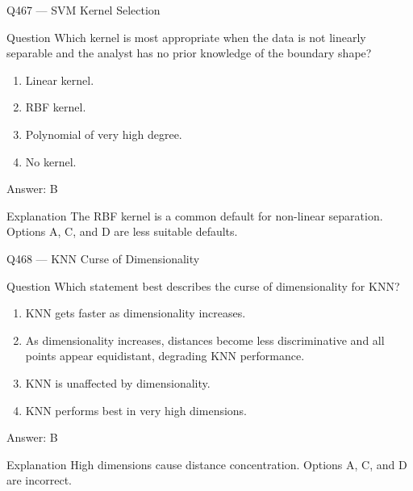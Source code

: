 \documentclass[aspectratio=169,8pt]{beamer}
\begin{document}
	\begin{frame}{Q467 --- SVM Kernel Selection}
		\begin{block}{Question}
			Which kernel is most appropriate when the data is not linearly separable and the analyst has no prior knowledge of the boundary shape?
			\begin{enumerate}
				\item Linear kernel.
				\item RBF kernel.
				\item Polynomial of very high degree.
				\item No kernel.
			\end{enumerate}
		\end{block}
		\begin{exampleblock}{Answer: B}\end{exampleblock}
		\begin{block}{Explanation}
			The RBF kernel is a common default for non-linear separation. Options A, C, and D are less suitable defaults.
		\end{block}
	\end{frame}
	
	\begin{frame}{Q468 --- KNN Curse of Dimensionality}
		\begin{block}{Question}
			Which statement best describes the curse of dimensionality for KNN?
			\begin{enumerate}
				\item KNN gets faster as dimensionality increases.
				\item As dimensionality increases, distances become less discriminative and all points appear equidistant, degrading KNN performance.
				\item KNN is unaffected by dimensionality.
				\item KNN performs best in very high dimensions.
			\end{enumerate}
		\end{block}
		\begin{exampleblock}{Answer: B}\end{exampleblock}
		\begin{block}{Explanation}
			High dimensions cause distance concentration. Options A, C, and D are incorrect.
		\end{block}
	\end{frame}
	
\end{document}
